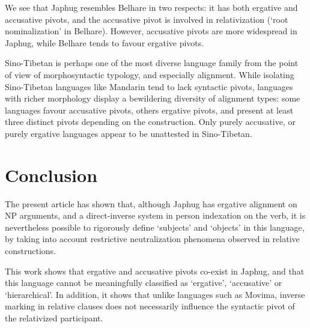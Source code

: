 \documentclass[oldfontcommands,oneside,a4paper,11pt]{article}
\begin{document}
 
We see that Japhug resembles Belhare in two respects: it has both ergative and accusative pivots, and the accusative pivot is involved in relativization (`root nominalization' in Belhare). However, accusative pivots  are  more widespread in Japhug, while Belhare tends to favour ergative pivots.  


Sino-Tibetan is perhaps one of the most diverse language family from the point of view of morphosyntactic typology, and especially alignment. While isolating Sino-Tibetan languages like Mandarin tend to lack syntactic pivots, languages with richer morphology display a bewildering diversity of alignment types: some languages favour accusative pivots, others ergative pivots, and present at least three distinct   pivots depending on the  construction. Only purely accusative, or purely ergative languages appear to be unattested in Sino-Tibetan.


\section{Conclusion}

The present article has shown that, although Japhug has ergative alignment on NP arguments, and a direct-inverse system in person indexation on the verb, it is nevertheless possible to rigorously define `subjects' and `objects' in this language, by taking into account restrictive neutralization phenomena observed in relative constructions.

This work shows that ergative and accusative pivots co-exist in Japhug, and that this language cannot be meaningfully classified as `ergative', `accusative' or `hierarchical'. In addition, it shows that unlike languages such as Movima, inverse marking in relative clauses does not necessarily influence the syntactic pivot of the relativized participant.

\theendnotes



\end{document}
